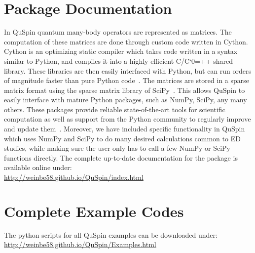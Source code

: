 \documentclass{SciPost}
\newcommand\0{\scalebox{-1}[1]{0}}
\let\svttfamily\ttfamily
\renewcommand\ttfamily{\svttfamily\catcode`0=\active }
\renewcommand\texttt{\bgroup\ttfamily\texttthelp}
\def\texttthelp#1{#1\egroup}
\begin{document}
\begin{appendix}
\section{Package Documentation}
\label{app:doc}
In QuSpin quantum many-body operators are represented as matrices. The computation of these matrices are done through custom code written in Cython. Cython is an optimizing static compiler which takes code written in a syntax similar to Python, and compiles it into a highly efficient C/C\texttt{++} shared library. These libraries are then easily interfaced with Python, but can run orders of magnitude faster than pure Python code~\cite{Cython}. The matrices are stored in a sparse matrix format using the sparse matrix library of SciPy~\cite{SciPy_package}. This allows QuSpin to easily interface with mature Python packages, such as NumPy, SciPy, any many others. These packages provide reliable state-of-the-art tools for scientific computation as well as support from the Python community to regularly improve and update them~\cite{NumPy,Python_computing_1,Python_computing_2,SciPy_package}. Moreover, we have included specific functionality in QuSpin which uses NumPy and SciPy to do many desired calculations common to ED studies, while making sure the user only has to call a few NumPy or SciPy functions directly. The complete up-to-date documentation for the package is available online under:\\
	
\href{http://weinbe58.github.io/QuSpin/index.html}{http://weinbe58.github.io/QuSpin/index.html}\\
	
\section{Complete Example Codes}
\label{app:scripts}
	
The python scripts for all QuSpin examples can be downloaded under:\\

\href{http://weinbe58.github.io/QuSpin/Examples.html}{http://weinbe58.github.io/QuSpin/Examples.html}\\
	
\end{appendix}


%
%

\nolinenumbers
\end{document}
